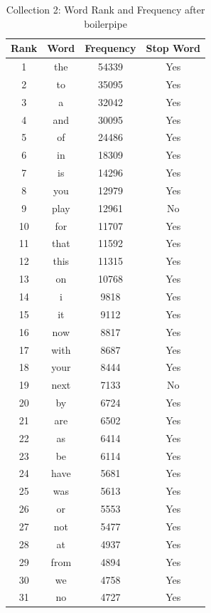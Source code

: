 \begin{table}
\caption{Collection 2: Word Rank and Frequency after boilerpipe}
\begin{center}
\begin{tabular}{ c | c | c | c}
\hline
Rank & Word & Frequency & Stop Word \\ \hline

1 & the & 54339 & Yes \\ \hline
2 & to & 35095 & Yes \\ \hline
3 & a & 32042 & Yes \\ \hline
4 & and & 30095 & Yes \\ \hline
5 & of & 24486 & Yes \\ \hline
6 & in & 18309 & Yes \\ \hline
7 & is & 14296 & Yes \\ \hline
8 & you & 12979 & Yes \\ \hline
9 & play & 12961 & No \\ \hline
10 & for & 11707 & Yes \\ \hline
11 & that & 11592 & Yes \\ \hline
12 & this & 11315 & Yes \\ \hline
13 & on & 10768 & Yes \\ \hline
14 & i & 9818 & Yes \\ \hline
15 & it & 9112 & Yes \\ \hline
16 & now & 8817 & Yes \\ \hline
17 & with & 8687 & Yes \\ \hline
18 & your & 8444 & Yes \\ \hline
19 & next & 7133 & No \\ \hline
20 & by & 6724 & Yes \\ \hline
21 & are & 6502 & Yes \\ \hline
22 & as & 6414 & Yes \\ \hline
23 & be & 6114 & Yes \\ \hline
24 & have & 5681 & Yes \\ \hline
25 & was & 5613 & Yes \\ \hline
26 & or & 5553 & Yes \\ \hline
27 & not & 5477 & Yes \\ \hline
28 & at & 4937 & Yes \\ \hline
29 & from & 4894 & Yes \\ \hline
30 & we & 4758 & Yes \\ \hline
31 & no & 4727 & Yes \\ \hline

\end{tabular}
\end{center}
\end{table}
